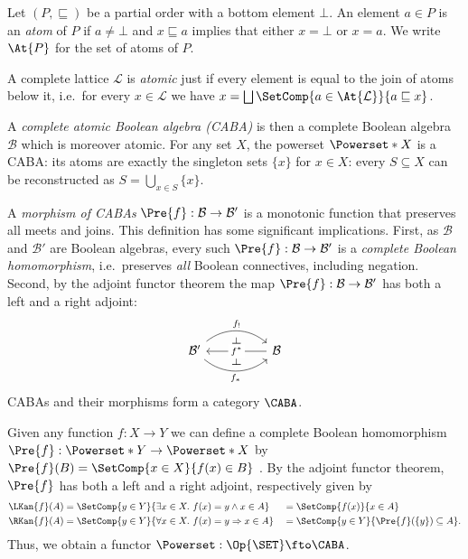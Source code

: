 \documentclass[a4paper,UKenglish,cleveref, autoref]{lipics-v2021}
\begin{document}
\begin{definition}[Atom]
  Let $(P, \sqsubseteq)$ be a partial order with a bottom element $\bot$. An
  element $a \in P$ is an \emph{atom} of $P$ if $a \neq \bot$ and $x \sqsubseteq
  a$ implies that either $x = \bot$ or $x = a$. We write $\At{P}$ for the set of
  atoms of $P$.
\end{definition}

\begin{definition}
  A complete lattice $\mathcal{L}$ is \emph{atomic} just if every element is
  equal to the join of atoms below it, i.e.\ for every $x \in \mathcal{L}$ we
  have $x = \bigsqcup \SetComp{ a \in \At{\mathcal{L}}}{ a \sqsubseteq x }$.
\end{definition}

A \emph{complete atomic Boolean algebra (CABA)} is then a complete Boolean
algebra $\mathcal{B}$ which is moreover atomic. For any set $X$, the powerset $\Powerset*{X}$
is a CABA: its atoms are exactly the singleton sets $\{ x \}$ for $x \in X$:
every $S \subseteq X$ can be reconstructed as $S = \bigcup_{x \in S} \{ x \}$.

A \emph{morphism of CABAs} $\Pre{f} : \mathcal{B} \to \mathcal{B}'$ is
a monotonic function that preserves all meets and joins. This
definition has some significant implications. First, as $\mathcal{B}$
and $\mathcal{B}'$ are Boolean algebras, every such
$\Pre{f} : \mathcal{B} \to \mathcal{B}'$ is a \emph{complete Boolean
  homomorphism}, i.e.\ preserves \emph{all} Boolean connectives,
including negation. Second, by the adjoint functor theorem the map
$\Pre{f} : \mathcal{B} \to \mathcal{B}'$ has both a left and a right
adjoint:
\[
  \begin{tikzcd}[column sep=huge]
    \mathcal{B}' \arrow[r, bend left=40, "f_!"] \arrow[r, bend right=40, "f_*"'] & \mathcal{B} \arrow[l, "f^*" description] \arrow[phantom, from=1-1, to=1-2, "{\rotatebox[origin=c]{-90}{$\dashv$}}" pos=0.5, shift left=3.5, description] \arrow[phantom, from=1-1, to=1-2, "{\rotatebox[origin=c]{-90}{$\dashv$}}", pos=0.5, shift right=3.5, description]
  \end{tikzcd}
\]
CABAs and their morphisms form a category $\CABA$.

Given any function $f : X \to Y$ we can define a complete Boolean homomorphism
$\Pre{f} : \Powerset*{Y} \to \Powerset*{X}$ by $\Pre{f}(B) = \SetComp{ x \in X
}{ f(x) \in B}$ \cite{lawvere_1970,mellies_2016,kishida_2018}. By the adjoint
functor theorem, $\Pre{f}$ has both a left and a right adjoint, respectively
given by
\begin{alignat*}{2}
  \LKan{f}(A) &= \SetComp{ y \in Y }{\exists x \in X.\ f(x) = y \land x \in A }
  &&= \SetComp{ f(x) }{ x \in A } \\
  \RKan{f}(A) &= \SetComp{ y \in Y }{ \forall x \in X.\ f(x) = y \Rightarrow x \in A }
  &&= \SetComp { y \in Y }{ \Pre{f}(\{ y \}) \subseteq A }.
\end{alignat*}
Thus, we obtain a functor $\Powerset : \Op{\SET} \fto \CABA$.
\end{document}
